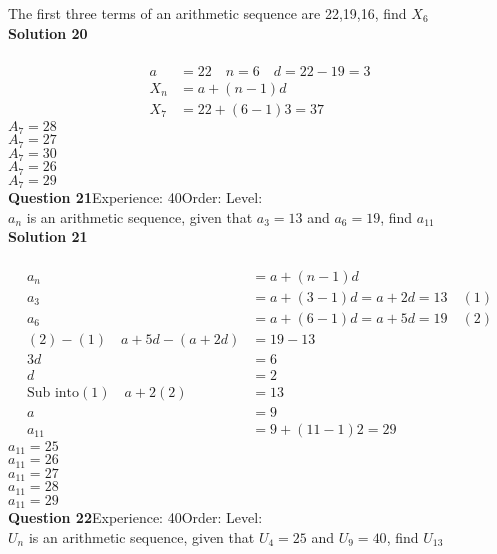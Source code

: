 \documentclass{article}
\begin{document}
The first three terms of an arithmetic sequence are 22,19,16, find $X_6$\\[4pt]
\noindent\textbf{Solution 20}\\[2pt]
\\[-10pt]\begin{align*}
a&=22 \quad n=6 \quad d=22-19=3\\[2pt]
X_n&=a+(n-1)d\\[2pt]
X_7&=22+(6-1)3=37
\end{align*}
$A_7=28$\\
$A_7=27$\\
$A_7=30$\\
$A_7=26$\\
$A_7=29$\\
\noindent\textbf{Question 21}\hspace{20pt}Experience: 40\hspace{20pt}Order: \hspace{20pt}Level: \\[2pt]
$a_n$ is an arithmetic sequence, given that $a_3=13$ and $a_6=19$, find $a_{11}$\\[4pt]
\noindent\textbf{Solution 21}\\[2pt]
\\[-10pt]\begin{align*}
a_n&=a+(n-1)d\\[2pt]
a_3&=a+(3-1)d=a+2d=13\quad (1)\\[2pt]
a_6&=a+(6-1)d=a+5d=19\quad (2)\\[2pt]
(2)-(1)\quad a+5d-(a+2d)&=19-13\\[2pt]
3d&=6\\[2pt]
d&=2\\[12pt]
\text{Sub into} (1) \quad a+2(2)&=13\\[2pt]
a&=9\\[12pt]
a_{11}&=9+(11-1)2=29
\end{align*}
$a_{11}=25$\\
$a_{11}=26$\\
$a_{11}=27$\\
$a_{11}=28$\\
$a_{11}=29$\\
\noindent\textbf{Question 22}\hspace{20pt}Experience: 40\hspace{20pt}Order: \hspace{20pt}Level: \\[2pt]
$U_n$ is an arithmetic sequence, given that $U_4=25$ and $U_9=40$, find $U_{13}$\\[4pt]
\end{document}
